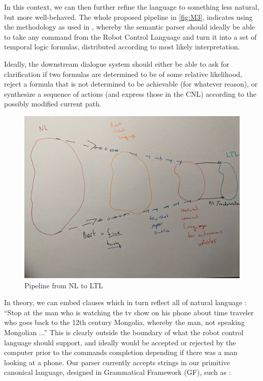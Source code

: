 \documentclass[a4paper, 11pt]{article}
\begin{document}
In this context, we can then further refine the language to something less
natural, but more well-behaved. The whole proposed pipeline in \autoref{fig:M3},
indicates using the methodology as used in \cite{fewShotSem}, whereby the
semantic parser should ideally be able to take any command from the Robot
Control Language and turn it into a set of temporal logic formulas, distributed
according to most likely interpretation.

Ideally, the downstream dialogue system should either be able to ask for
clarification if two formulas are determined to be of some relative likelihood,
reject a formula that is not determined to be achievable (for whatever reason),
or synthesize a sequence of actions (and express those in the CNL) according to
the possibly modified current path.

\begin{figure}
\centering
\includegraphics[width=150mm]{pics/three.jpg}
\caption{Pipeline from NL to LTL}\label{fig:M3}
\end{figure}

In theory, we can embed clauses which in turn reflect all of natural language :
``Stop at the man who is watching the tv show on his phone about time traveler
who goes back to the 12th century Mongolia, whereby the man, not speaking
Mongolian ...'' This is clearly outside the boundary of what the robot control
language should support, and ideally would be accepted or rejected by the
computer prior to the commands completion depending if there was a man looking
at a phone. Our parser currently accepts strings in our primitive canonical
language, designed in Grammatical Framework (GF), such as :
\end{document}
